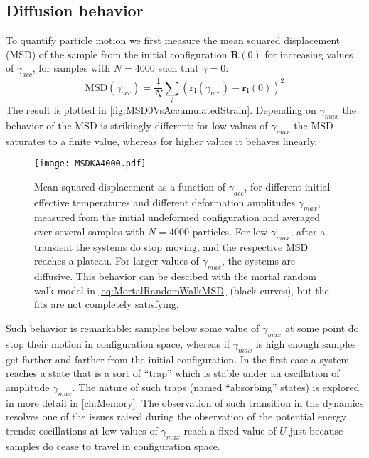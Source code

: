 \subsection{Diffusion behavior \label{sec:DiffusionBehavior}}

To quantify particle motion we first measure the mean squared displacement (MSD) of the sample from the initial configuration $\mathbf{R}(0)$ for increasing values of $\gamma_{acc}$, for samples with $N=4000$ such that $\gamma = 0$:
\begin{equation}
	\text{MSD} (\gamma_{acc}) = \frac{1}{N} \sum_{i}{(\mathbf{r_{i}}(\gamma_{acc}) - \mathbf{r_{i}}(0))^{2}}
	\label{eq:MSD0VsAccumulatedStrain}
\end{equation} 
The result is plotted in \autoref{fig:MSD0VsAccumulatedStrain}. Depending on $\gamma_{max}$ the behavior of the MSD is strikingly different: for low values of $\gamma_{max}$ the MSD saturates to a finite value, whereas for higher values it behaves linearly. 

\begin{figure}[!h] 
\centering 
\texttt{[image: MSDKA4000.pdf]} 
\caption{Mean squared displacement as a function of $\gamma_{acc}$, for different initial effective temperatures and different deformation amplitudes $\gamma_{max}$, measured from the initial undeformed configuration and averaged over several samples with $N=4000$ particles. For low $\gamma_{max}$, after a transient the systems do stop moving, and the respective MSD reaches a plateau. For larger values of $\gamma_{max}$, the systems are diffusive. This behavior can be descibed with the mortal random walk model in \autoref{eq:MortalRandomWalkMSD} (black curves), but the fits are not completely satisfying. \label{fig:MSD0VsAccumulatedStrain}}
\end{figure}

Such behavior is remarkable: samples below some value of $\gamma_{max}$ at some point do stop their motion in configuration space, whereas if $\gamma_{max}$ is high enough samples get farther and farther from the initial configuration. In the first case a system reaches a state that is a sort of ``trap'' which is stable under an oscillation of amplitude $\gamma_{max}$. The nature of such traps (named ``absorbing'' states) is explored in more detail in \autoref{ch:Memory}.
The observation of such transition in the dynamics resolves one of the issues raised during the observation of the potential energy trends: oscillations at low values of $\gamma_{max}$ reach a fixed value of $U$ just because samples do cease to travel in configuration space. 

